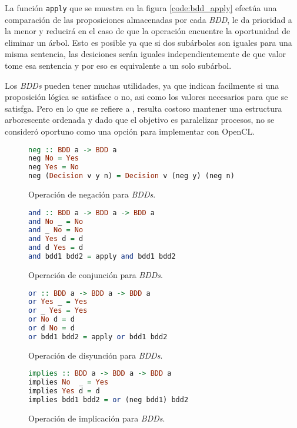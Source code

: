 La función \texttt{apply} que se muestra en la figura \ref{code:bdd_apply} efectúa una comparación de las proposiciones almacenadas por cada \textit{BDD}, le da prioridad a la menor y reducirá en el caso de que la operación encuentre la oportunidad de eliminar un árbol. Esto es posible ya que si dos subárboles son iguales para una misma sentencia, las desiciones serán iguales independientemente de que valor tome esa sentencia y por eso es equivalente a un solo subárbol.

Los \textit{BDDs} pueden tener muchas utilidades, ya que indican facilmente si una proposición lógica se satisface o no, asi como los valores necesarios para que se satisfga. Pero en lo que se refiere a \sat, resulta costoso mantener una estructura arborescente ordenada y dado que el objetivo es paralelizar procesos, no se consideró oportuno como una opción para implementar con OpenCL.

\begin{figure}
\begin{lstlisting}[language=Haskell]
neg :: BDD a -> BDD a
neg No = Yes
neg Yes = No
neg (Decision v y n) = Decision v (neg y) (neg n)
\end{lstlisting}
\caption{Operación de negación para \textit{BDDs}.}
\label{code:bdd_neg}
\end{figure}

\begin{figure}
\begin{lstlisting}[language=Haskell]
and :: BDD a -> BDD a -> BDD a
and No _ = No
and _ No = No
and Yes d = d
and d Yes = d
and bdd1 bdd2 = apply and bdd1 bdd2
\end{lstlisting}
\caption{Operación de conjunción para \textit{BDDs}.}
\label{code:bdd_and}
\end{figure}

\begin{figure}
\begin{lstlisting}[language=Haskell]
or :: BDD a -> BDD a -> BDD a
or Yes _ = Yes
or _ Yes = Yes
or No d = d
or d No = d
or bdd1 bdd2 = apply or bdd1 bdd2
\end{lstlisting}
\caption{Operación de disyunción para \textit{BDDs}.}
\label{code:bdd_or}
\end{figure}

\begin{figure}
\begin{lstlisting}[language=Haskell]
implies :: BDD a -> BDD a -> BDD a
implies No  _ = Yes
implies Yes d = d
implies bdd1 bdd2 = or (neg bdd1) bdd2
\end{lstlisting}
\caption{Operación de implicación para \textit{BDDs}.}
\label{code:bdd_implies}
\end{figure}

